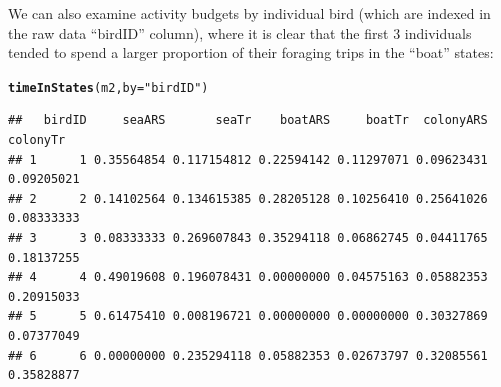 \documentclass[12pt]{article}\usepackage[]{graphicx}\usepackage[]{color}
\makeatletter
\newcommand{\hlstr}[1]{\textcolor[rgb]{0.192,0.494,0.8}{#1}}%
\newcommand{\hlstd}[1]{\textcolor[rgb]{0.345,0.345,0.345}{#1}}%
\newcommand{\hlkwc}[1]{\textcolor[rgb]{0.333,0.667,0.333}{#1}}%
\newcommand{\hlkwd}[1]{\textcolor[rgb]{0.737,0.353,0.396}{\textbf{#1}}}%
\newenvironment{kframe}{%
 \def\at@end@of@kframe{}%
 \ifinner\ifhmode%
  \def\at@end@of@kframe{\end{minipage}}%
  \begin{minipage}{\columnwidth}%
 \fi\fi%
 \def\FrameCommand##1{\hskip\@totalleftmargin \hskip-\fboxsep
 \colorbox{shadecolor}{##1}\hskip-\fboxsep
     \hskip-\linewidth \hskip-\@totalleftmargin \hskip\columnwidth}%
 \MakeFramed {\advance\hsize-\width
   \@totalleftmargin\z@ \linewidth\hsize
   \@setminipage}}%
 {\par\unskip\endMakeFramed%
 \at@end@of@kframe}
\newenvironment{knitrout}{}{} %
\makeatother
\begin{document}
We can also examine activity budgets by individual bird (which are indexed in the raw data ``birdID'' column), where it is clear that the first 3 individuals tended to spend a larger proportion of their foraging trips in the ``boat'' states:
\begin{knitrout}
\color{fgcolor}\begin{kframe}
\begin{alltt}
\hlkwd{timeInStates}\hlstd{(m2,} \hlkwc{by} \hlstd{=} \hlstr{"birdID"}\hlstd{)}
\end{alltt}
\end{kframe}
\end{knitrout}
\begin{knitrout}
\color{fgcolor}\begin{kframe}
\begin{verbatim}
##   birdID     seaARS       seaTr    boatARS     boatTr  colonyARS   colonyTr
## 1      1 0.35564854 0.117154812 0.22594142 0.11297071 0.09623431 0.09205021
## 2      2 0.14102564 0.134615385 0.28205128 0.10256410 0.25641026 0.08333333
## 3      3 0.08333333 0.269607843 0.35294118 0.06862745 0.04411765 0.18137255
## 4      4 0.49019608 0.196078431 0.00000000 0.04575163 0.05882353 0.20915033
## 5      5 0.61475410 0.008196721 0.00000000 0.00000000 0.30327869 0.07377049
## 6      6 0.00000000 0.235294118 0.05882353 0.02673797 0.32085561 0.35828877
\end{verbatim}
\end{kframe}
\end{knitrout}
\end{document}
